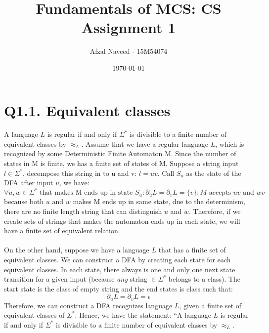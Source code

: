 \documentclass[a4paper,12pt]{article}
\begin{document}
\title{Fundamentals of MCS: CS Assignment 1 }

\author{Afzal Naveed - 15M54074}

\date{\today}

\maketitle

\section*{Q1.1. Equivalent classes}
\noindent

\paragraph{}A language $L$ is regular if and only if $\Sigma^{*}$ is divisible to a finite number of equivalent classes by $\approx_L$. Assume that we have a regular language $L$, which is recognized by some Deterministic Finite Automaton M. Since the number of states in M is finite, we has a finite set of states of M. Suppose a string input $l \in \Sigma^{*}$, decompose this string in to u and v: $l = uv$. Call $S_u$ as the state of the DFA after input $u$, we have:
$$ \forall u, w \in \Sigma^{*} \mbox{ that makes M ends up in state } S_u : \partial_{u}L = \partial_{v}L = \{v\} : M \mbox{ accepts } uv \mbox{ and } wv $$ 
because both $u$ and $w$ makes M ends up in same state, due to the determinism, there are no finite length string that can distinguish $u$ and $w$. Therefore, if we create sets of strings that makes the automaton ends up in each state, we will have a finite set of equivalent relation.
\paragraph{}On the other hand, suppose we have a language $L$ that has a finite set of equivalent classes. We can construct a DFA by creating each state for each equivalent classes. In each state, there always is one and only one next state transition for a given input (because \emph{any} string $\in \Sigma^{*}$ belongs to a class). The start state is the class of empty string and the end states is class such that:
$$ \partial_uL = \partial_vL = {\epsilon} $$
Therefore, we can construct a DFA recognizes language $L$, given a finite set of equivalent classes of $\Sigma^{*}$. Hence, we have the statement: ``A language $L$ is regular if and only if $\Sigma^{*}$ is divisible to a finite number of equivalent classes by $\approx_L$.
\end{document}
